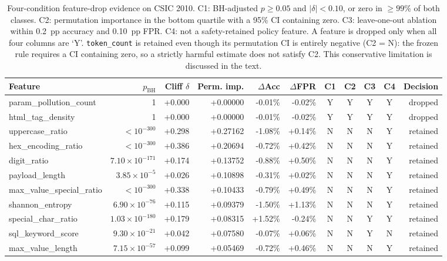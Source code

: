 \begin{table}[t]
\centering
\caption{Four-condition feature-drop evidence on CSIC 2010.
C1: BH-adjusted $p\ge0.05$ and $|\delta|<0.10$, or zero in $\ge99\%$
of both classes. C2: permutation importance in the bottom quartile with a
95\% CI containing zero. C3: leave-one-out ablation within 0.2~pp accuracy
and 0.10~pp FPR. C4: not a safety-retained policy feature.
A feature is dropped only when all four columns are `Y'.
\texttt{token\_count} is retained even though its permutation CI is
entirely negative (C2 = N): the frozen rule requires a CI containing zero,
so a strictly harmful estimate does not satisfy C2. This conservative
limitation is discussed in the text.}
\label{tab:drop-evidence}
\scriptsize
\begin{tabular}{lrrrrrccccr}
\toprule
Feature & $p_{\mathrm{BH}}$ & Cliff $\delta$ & Perm. imp. & $\Delta$Acc & $\Delta$FPR & C1 & C2 & C3 & C4 & Decision \\
\midrule
param\_pollution\_count & 1 & +0.000 & +0.00000 & -0.01\% & -0.02\% & Y & Y & Y & Y & dropped \\
html\_tag\_density & 1 & +0.000 & +0.00000 & -0.01\% & -0.02\% & Y & Y & Y & Y & dropped \\
uppercase\_ratio & $<10^{-300}$ & +0.298 & +0.27162 & -1.08\% & +0.14\% & N & N & N & Y & retained \\
hex\_encoding\_ratio & $<10^{-300}$ & +0.386 & +0.20694 & -0.72\% & +0.42\% & N & N & N & Y & retained \\
digit\_ratio & $7.10\times10^{-171}$ & +0.174 & +0.13752 & -0.88\% & +0.50\% & N & N & N & Y & retained \\
payload\_length & $3.85\times10^{-5}$ & +0.026 & +0.10898 & -0.31\% & +0.02\% & N & N & N & Y & retained \\
max\_value\_special\_ratio & $<10^{-300}$ & +0.338 & +0.10433 & -0.79\% & +0.49\% & N & N & N & Y & retained \\
shannon\_entropy & $6.90\times10^{-76}$ & +0.115 & +0.09379 & -1.50\% & +1.13\% & N & N & N & Y & retained \\
special\_char\_ratio & $1.03\times10^{-180}$ & +0.179 & +0.08315 & +1.52\% & -0.24\% & N & N & Y & Y & retained \\
sql\_keyword\_score & $9.30\times10^{-21}$ & +0.042 & +0.07580 & -0.07\% & +0.06\% & N & N & Y & N & retained \\
max\_value\_length & $7.15\times10^{-57}$ & +0.099 & +0.05469 & -0.72\% & +0.46\% & N & N & N & Y & retained \\

\end{tabular}
\end{table}
